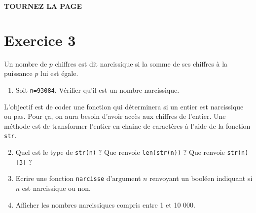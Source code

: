 \documentclass[a4paper,12pt]{article}
\begin{document}
\vfill{\textbf{\Large TOURNEZ LA PAGE}

\newpage



\section*{Exercice 3}
\noi Un nombre de $p$ chiffres est dit narcissique si la somme de ses chiffres à la puissance $p$ lui est égale.
\begin{enumerate}
\item Soit \verb?n=93084?. Vérifier qu'il est un nombre narcissique. 
\end{enumerate}
L'objectif est de coder une fonction qui déterminera si un entier est narcissique ou pas. Pour ça, on aura besoin d'avoir accès aux chiffres de l'entier. Une méthode est de transformer l'entier en chaine de caractères à l'aide de la fonction \verb?str?.
\begin{enumerate}
\setcounter{enumi}{1}
\item Quel est le type de \verb?str(n)? ? Que renvoie \verb?len(str(n))? ? Que renvoie \verb?str(n)[3]? ? 
\item Ecrire une fonction \verb?narcisse? d'argument $n$ renvoyant un booléen indiquant si $n$ est narcissique ou non.
\item Afficher les nombres narcissiques compris entre 1 et 10 000.
\end{enumerate}



}
\end{document}
